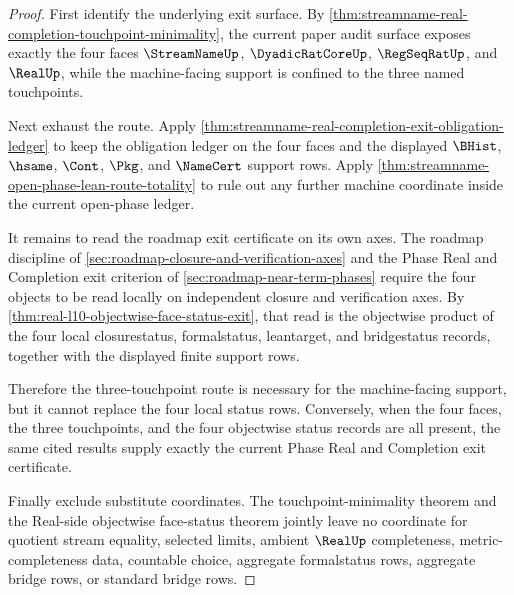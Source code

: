 \begin{proof}
First identify the underlying exit surface. By \autoref{thm:streamname-real-completion-touchpoint-minimality}, the current paper audit surface exposes exactly the four faces $\StreamNameUp$, $\DyadicRatCoreUp$, $\RegSeqRatUp$, and $\RealUp$, while the machine-facing support is confined to the three named touchpoints.

Next exhaust the route. Apply \autoref{thm:streamname-real-completion-exit-obligation-ledger} to keep the obligation ledger on the four faces and the displayed $\BHist$, $\hsame$, $\Cont$, $\Pkg$, and $\NameCert$ support rows. Apply \autoref{thm:streamname-open-phase-lean-route-totality} to rule out any further machine coordinate inside the current open-phase ledger.

It remains to read the roadmap exit certificate on its own axes. The roadmap discipline of \autoref{sec:roadmap-closure-and-verification-axes} and the Phase Real and Completion exit criterion of \autoref{sec:roadmap-near-term-phases} require the four objects to be read locally on independent closure and verification axes. By \autoref{thm:real-l10-objectwise-face-status-exit}, that read is the objectwise product of the four local closurestatus, formalstatus, leantarget, and bridgestatus records, together with the displayed finite support rows.

Therefore the three-touchpoint route is necessary for the machine-facing support, but it cannot replace the four local status rows. Conversely, when the four faces, the three touchpoints, and the four objectwise status records are all present, the same cited results supply exactly the current Phase Real and Completion exit certificate.

Finally exclude substitute coordinates. The touchpoint-minimality theorem and the Real-side objectwise face-status theorem jointly leave no coordinate for quotient stream equality, selected limits, ambient $\RealUp$ completeness, metric-completeness data, countable choice, aggregate formalstatus rows, aggregate bridge rows, or standard bridge rows.
\end{proof}

